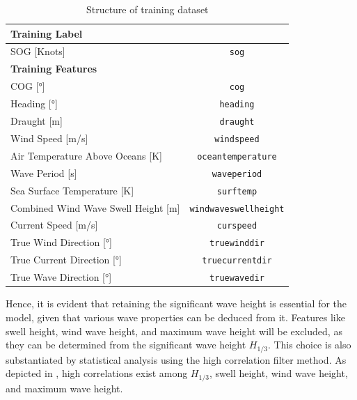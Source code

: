 \begin{table}
    \footnotesize
    \centering
    {\begin{tabular}{ p{8cm}c }
    \hline
    \multicolumn{2}{l}{\textbf{Training Label}}\\
    \hline
    SOG [Knots] & {\tt sog} \\
    \hline
    \multicolumn{2}{l}{\textbf{Training Features}}\\
    \hline
    COG [°] & {\tt cog}  \\
    Heading [°] & {\tt heading}  \\
    Draught [m] & {\tt draught} \\
    Wind Speed [m/s] & {\tt windspeed} \\
    Air Temperature Above Oceans [K] & {\tt oceantemperature} \\
    Wave Period [s] & {\tt waveperiod}\\
    Sea Surface Temperature [K] & {\tt surftemp}\\
    Combined Wind Wave Swell Height [m] &  {\tt windwaveswellheight} \\
    Current Speed [m/s] & {\tt curspeed} \\
    True Wind Direction [°] & {\tt truewinddir}  \\
    True Current Direction [°] & {\tt truecurrentdir} \\
    True Wave Direction [°] & {\tt truewavedir} \\
    \hline
    \end{tabular}}
\caption{Structure of training dataset}\label{tbl:struct_train_final}
\end{table}

Hence, it is evident that retaining the significant wave height is essential for the model, given that various wave properties can be deduced from it. Features like swell height, wind wave height, and maximum wave height will be excluded, as they can be determined from the significant wave height $H_{1/3}$. This choice is also substantiated by statistical analysis using the high correlation filter method. As depicted in , high correlations exist among $H_{1/3}$, swell height, wind wave height, and maximum wave height.\\

